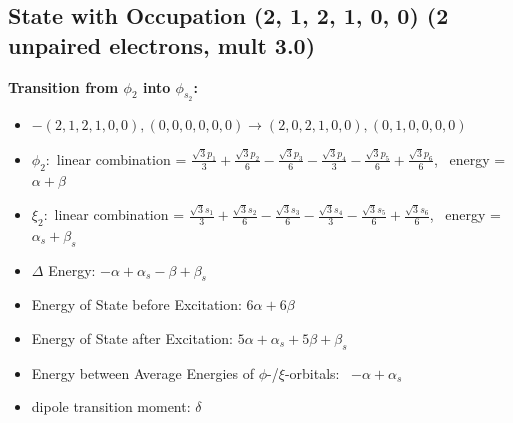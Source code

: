 \documentclass[12pt,a4paper]{article}
\begin{document}
\subsection*{State with Occupation (2, 1, 2, 1, 0, 0) (2 unpaired electrons, mult 3.0)}
        \noindent\textbf{Transition from $\phi_{2}$ into $\phi_{s_{2}}$:}
        \begin{itemize}
            \item $- (2, 1, 2, 1, 0, 0), (0, 0, 0, 0, 0, 0) \rightarrow (2, 0, 2, 1, 0, 0), (0, 1, 0, 0, 0, 0)$
        
            \item $\phi_{2}:$ linear combination = $\frac{\sqrt{3} p_{1}}{3} + \frac{\sqrt{3} p_{2}}{6} - \frac{\sqrt{3} p_{3}}{6} - \frac{\sqrt{3} p_{4}}{3} - \frac{\sqrt{3} p_{5}}{6} + \frac{\sqrt{3} p_{6}}{6}$, \
            energy = $\alpha + \beta$
            
            \item $\xi_{2}:$ linear combination = $\frac{\sqrt{3} s_{1}}{3} + \frac{\sqrt{3} s_{2}}{6} - \frac{\sqrt{3} s_{3}}{6} - \frac{\sqrt{3} s_{4}}{3} - \frac{\sqrt{3} s_{5}}{6} + \frac{\sqrt{3} s_{6}}{6}$, \
            energy = $\alpha_{s} + \beta_{s}$
            
            \item $\Delta$ Energy: $- \alpha + \alpha_{s} - \beta + \beta_{s}$
            \item Energy of State before Excitation: $6 \alpha + 6 \beta$
            \item Energy of State after Excitation: $5 \alpha + \alpha_{s} + 5 \beta + \beta_{s}$
            \item Energy between Average Energies of $\phi$-/$\xi$-orbitals: \
            $- \alpha + \alpha_{s}$
        
            \item dipole transition moment: $\delta$
        
        \end{itemize}
        
\end{document}
